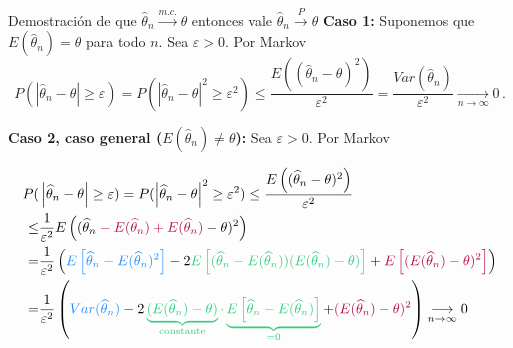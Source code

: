 \documentclass{beamer}
\theoremstyle{definition}
\newcommand{\cmc}{\overset{m.c.}{\rightarrow}}
\newcommand{\eps}{\varepsilon}
\newcommand{\ton}{\underset{n\to\infty}{\longrightarrow}}
\newcommand{\cp}{\overset{P}{\rightarrow}}
\begin{document}
\begin{frame}[noframenumbering]{\color{rosee}Demostraci\'on de que $\widehat{\theta}_n\cmc \theta$ entonces vale $\widehat{\theta}_n \cp \theta$}
\small
\textbf{Caso 1:} Suponemos que $E(\widehat{\theta}_n)=\theta$ para todo $n$. Sea $\varepsilon>0$. Por Markov
    \[P(\left\vert \widehat{\theta}_n -\theta \right\vert \geq \varepsilon)=P(\left\vert \widehat{\theta}_n -\theta \right\vert^2 \geq \varepsilon^2)\leq \dfrac{E\left((\widehat{\theta}_n-\theta)^2\right)}{\eps^2}=
    \frac{Var(\widehat{\theta}_n)}{\varepsilon^{2}} \ton 0\,.\]
  
\textbf{Caso 2, caso general ($E(\widehat{\theta}_n)\neq\theta$):} Sea $\varepsilon>0$. Por Markov


\begin{align*}
    P(&\left\vert \widehat{\theta}_n -\theta \right\vert \geq \varepsilon)=P(\left\vert \widehat{\theta}_n -\theta \right\vert^2 \geq \varepsilon^2)\leq \dfrac{E\left((\widehat{\theta}_n-\theta)^2\right)}{\eps^2}\\
    \leq& \dfrac{1}{\eps^2}E\left((\widehat{\theta}_n\color{rosee}-E(\widehat{\theta}_n)+E(\widehat{\theta}_n)\color{black}-\theta)^2\right)\\
   =&\dfrac{1}{\eps^2}\left(\color{dodgerblue}E\left[\widehat{\theta}_n-E(\widehat{\theta}_n)^2\right]\color{black}-2\color{gren}E\left[(\widehat{\theta}_n-E(\widehat{\theta}_n))(E(\widehat{\theta}_n)-\theta)\right]\color{black}+\color{rosee}E\left[(E(\widehat{\theta}_n)-\theta)^2\right]\color{black}\right)\\
   =&\dfrac{1}{\eps^2} \left(\color{dodgerblue}Var(\widehat{\theta}_n)\color{black}-2\color{gren}\underbrace{(E(\widehat{\theta}_n)-\theta)}_{\text{constante}}\cdot \underbrace{E\left[\widehat{\theta}_n-E(\widehat{\theta}_n)\right]}_{=0}\color{black}+\color{rosee}(E(\widehat{\theta}_n)-\theta)^2\color{black}\right)\ton 0
\end{align*}
 


\end{frame}
\end{document}
